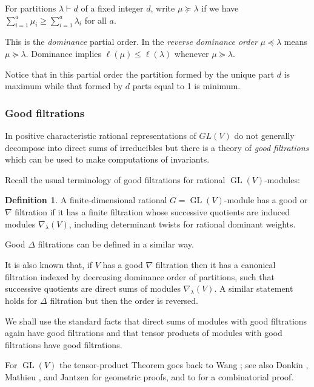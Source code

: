 \documentclass[10pt]{amsart}
\theoremstyle{definition}
\newtheorem{definition}[theorem]{Definition}
\theoremstyle{remark}
\newcommand{\GL}{\operatorname{GL}}
\begin{document}
For partitions $\lambda\vdash d$ of a fixed integer $d$, write $\mu\succeq\lambda$
if we have $\sum_{i=1}^{a}\mu_i\geq\sum_{i=1}^{a}\lambda_i$
for all $a$. \smallskip

 This is the {\em dominance} partial order.  In the
\emph{reverse dominance order} $\mu\preceq\lambda$ means
$\mu \succeq\lambda$.  Dominance implies
$\ell(\mu)\leq\ell(\lambda)$ whenever $\mu \succeq\lambda$.
 \smallskip

Notice that in this partial order the partition formed by the unique part $d$ is maximum while that formed by $d$ parts equal to 1 is minimum.

\medskip
 
  \subsubsection{Good filtrations} In positive  characteristic rational representations of  $GL(V)$  do not generally decompose into direct sums of irreducibles  but  there is a theory of {\em good filtrations} which can be used to  make computations of invariants.
  
  Recall the usual terminology of good filtrations for rational
$\GL(V)$-modules: 
\begin{definition}\label{goodfi}
A finite-dimensional rational $G=\GL(V)$-module has a good or  $\nabla$  filtration
if it has a finite filtration whose successive quotients are induced
modules $\nabla_\lambda(V)$, including determinant twists for rational dominant weights.

Good    $\Delta$  filtrations can be defined in a similar way.
\end{definition} 
It is also known that, if $V$ has a good $\nabla$ filtration then it has a canonical filtration indexed by decreasing dominance order of partitions, such that  successive quotients are direct sums of modules   $\nabla_\lambda(V)$. A similar statement holds for   $\Delta$  filtration but then the order is reversed.\smallskip


We shall use the
standard facts that direct sums of modules with good filtrations again have
good filtrations and that tensor products of modules with good filtrations
have good filtrations. \smallskip

For $\GL(V)$ the tensor-product Theorem goes back to
Wang \cite{Wang}; see also Donkin \cite{Donkin}, Mathieu \cite{Mathieu}, and
Jantzen \cite[II.4]{Jantzen} for geometric proofs, and  to \cite{depr0} for a combinatorial proof.\medskip
\end{document}
